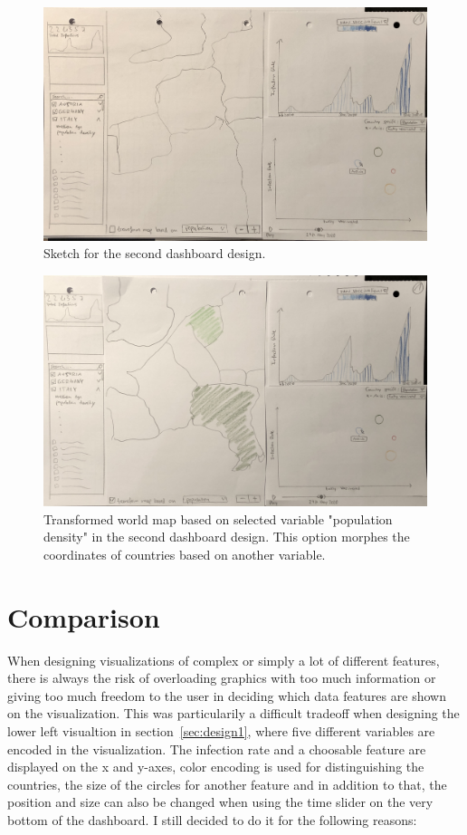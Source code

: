 \documentclass[11pt]{article}
\begin{document}
\begin{figure}[!htb]
    \centering
    \includegraphics[width=\linewidth]{images/design20.jpg}
    \caption{Sketch for the second dashboard design.}
    \label{fig:design20}
\end{figure}

\begin{figure}[!htb]
    \centering
    \includegraphics[width=\linewidth]{images/design21.jpg}
    \caption{Transformed world map based on selected variable "population density" in the second dashboard design. This option morphes the coordinates of 
    countries based on another variable.}
    \label{fig:design21}
\end{figure}

\section{Comparison}
When designing visualizations of complex or simply a lot of different features, there is always the risk of overloading graphics with too much information or giving 
too much freedom to the user in deciding which data features are shown on the visualization. This was particularily a difficult tradeoff when designing the 
lower left visualtion in section~\ref{sec:design1}, where five different variables are encoded in the visualization. The infection rate and a choosable feature are 
displayed on the x and y-axes, color encoding is used for distinguishing the countries, the size of the circles for another feature and in addition to that, the 
position and size can also be changed when using the time slider on the very bottom of the dashboard. I still decided to do it for the following reasons:
\end{document}
